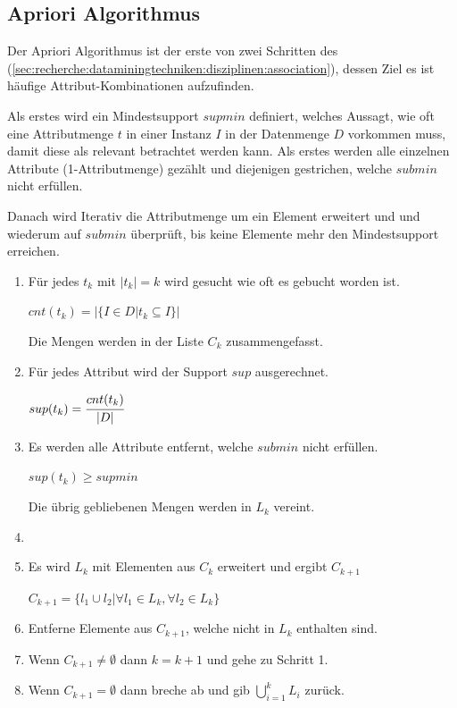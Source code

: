 \subsection{Apriori Algorithmus}
Der Apriori Algorithmus ist der erste von zwei Schritten des  (\cref{sec:recherche:dataminingtechniken:disziplinen:association}), dessen Ziel es ist häufige Attribut-Kombinationen aufzufinden. 

Als erstes wird ein Mindestsupport $supmin$ definiert, welches Aussagt, wie oft eine Attributmenge $t$ in einer Instanz $I$ in der Datenmenge $D$ vorkommen muss, damit diese als relevant betrachtet werden kann. Als erstes werden alle einzelnen Attribute (1-Attributmenge) gezählt und diejenigen gestrichen, welche $submin$ nicht erfüllen.

Danach wird Iterativ die Attributmenge um ein Element erweitert und und wiederum auf $submin$ überprüft, bis keine Elemente mehr den Mindestsupport erreichen.

\begin{enumerate}
\item Für jedes $t_k$ mit $|t_k| = k$ wird gesucht wie oft es gebucht worden ist.
	\begin{center}
	$cnt(t_k) = \big|\{I \in D | t_k \subseteq I \}\big|$
	\end{center}
	Die Mengen werden in der Liste $C_k$ zusammengefasst.
\item Für jedes Attribut wird der Support $sup$ ausgerechnet.
	\begin{center}
	$sup(t_k) = \cfrac{cnt(t_k)}{|D|}$
	\end{center}
\item Es werden alle Attribute entfernt, welche $submin$ nicht erfüllen.
	\begin{center}
	$sup(t_k) \ge supmin$
	\end{center}
	Die übrig gebliebenen Mengen werden in $L_k$ vereint.
\item {}
\item Es wird $L_k$ mit Elementen aus $C_k$ erweitert und ergibt $C_{k+1}$
	\begin{center}
	$ C_{k+1} = \{l_1 \cup l_2 | \forall l_1 \in L_k, \forall l_2 \in L_k \} $
	\end{center}
\item Entferne Elemente aus $C_{k+1}$, welche nicht in $L_k$ enthalten sind.
\item Wenn $C_{k+1} \neq \emptyset$ dann $k = k+1$ und gehe zu Schritt 1. 
\item Wenn $C_{k+1} = \emptyset$ dann breche ab und gib $\bigcup\limits_{i=1}^{k} L_{i}$ zurück.
\end{enumerate}

